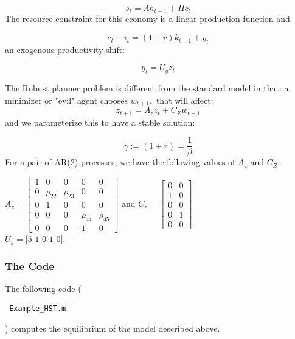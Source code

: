 \documentclass[letter, fleqn, 11pt]{article}
\begin{document}
\begin{equation*}
s_{t}=\Lambda h_{t-1}+\Pi c_{t}
\end{equation*}%
The resource constraint for this economy is a linear production function and

\begin{equation*}
c_{t}+i_{t}=\left( 1+r\right) k_{t-1}+y_{t}
\end{equation*}%
an exogenous productivity shift:

\begin{equation*}
y_{t}=U_{y}z_{t}
\end{equation*}

The Robust planner problem is different from the standard model in that: a
minimizer or "evil" agent chooses $w_{t+1},$ that will affect:%
\begin{equation*}
z_{t+1}=A_{z}z_{t}+C_{Z}w_{t+1}
\end{equation*}%
and we parameterize this to have a stable solution:

\begin{equation*}
\gamma :=\left( 1+r\right) =\frac{1}{\beta }
\end{equation*}%
For a pair of AR(2) processes, we have the following values of $A_{z}$ and $%
C_{Z}$:

$A_{z}=\left[
\begin{array}{ccccc}
1 & 0 & 0 & 0 & 0 \\
0 & \rho _{22} & \rho _{23} & 0 & 0 \\
0 & 1 & 0 & 0 & 0 \\
0 & 0 & 0 & \rho _{44} & \rho _{45} \\
0 & 0 & 0 & 1 & 0%
\end{array}%
\right] $ and $C_{z}=\left[
\begin{array}{cc}
0 & 0 \\
1 & 0 \\
0 & 0 \\
0 & 1 \\
0 & 0%
\end{array}%
\right] $ \\ $U_{y}=[5$ $1$ $0$ $1$ $0].$



\subsubsection{The Code}

The following code (\begin{verbatim} Example_HST.m \end{verbatim}) computes the equilibrium of the model described above.
\end{document}
